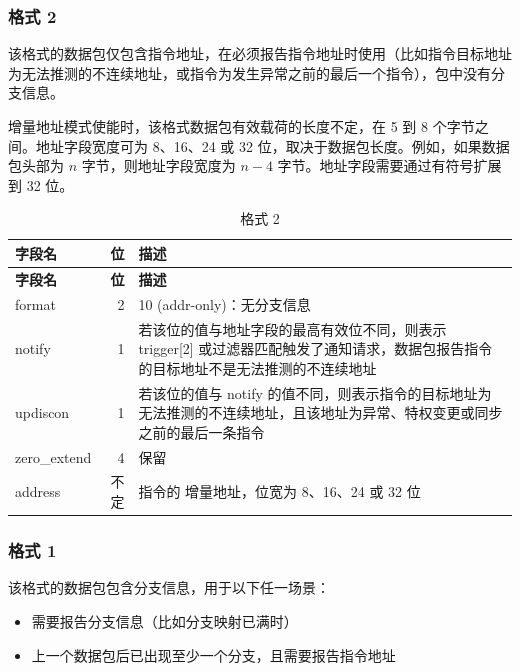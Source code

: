 \documentclass[main\_\_CN.tex]{subfiles}
\begin{document}
\subsubsection{格式 2}

该格式的数据包仅包含指令地址，在必须报告指令地址时使用（比如指令目标地址为无法推测的不连续地址，或指令为发生异常之前的最后一个指令），包中没有分支信息。

增量地址模式使能时，该格式数据包有效载荷的长度不定，在 5 到 8 个字节之间。地址字段宽度可为 8、16、24 或 32 位，取决于数据包长度。例如，如果数据包头部为 $n$ 字节，则地址字段宽度为 $n-4$ 字节。地址字段需要通过有符号扩展到 32 位。

\begin{longtable}[c]{ |l|r|L{10cm}| }
    \caption{格式 2}
    \label{tab:f2}
    \\\hline{}
    \textbf{字段名} & \textbf{位} & \textbf{描述} \\\hline
    \endfirsthead
    \hline
    \textbf{字段名} & \textbf{位} & \textbf{描述} \\\hline
    \endhead
    \endfoot
    \endlastfoot

    format & 2 & 10 (addr-only)：无分支信息 \\\hline
    notify & 1 & 若该位的值与地址字段的最高有效位不同，则表示 trigger[2] 或过滤器匹配触发了通知请求，数据包报告指令的目标地址不是无法推测的不连续地址 \\\hline
    updiscon & 1 & 若该位的值与 notify 的值不同，则表示指令的目标地址为无法推测的不连续地址，且该地址为异常、特权变更或同步之前的最后一条指令 \\\hline
    zero\_extend & 4 & 保留 \\\hline
    address & 不定 & 指令的 增量地址，位宽为 8、16、24 或 32 位 \\\hline
 \end{longtable}


\subsubsection{格式 1}

该格式的数据包包含分支信息，用于以下任一场景：
\begin{itemize}
    \item 需要报告分支信息（比如分支映射已满时）
    \item 上一个数据包后已出现至少一个分支，且需要报告指令地址
\end{itemize}
\end{document}
